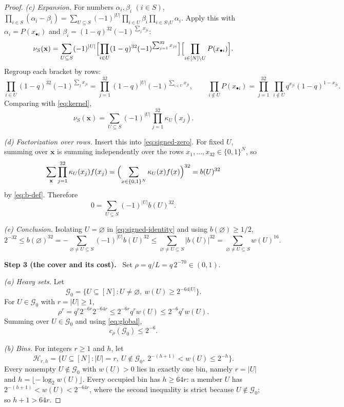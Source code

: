 \documentclass[11pt,letterpaper]{article}
\theoremstyle{definition}
\theoremstyle{remark}
\numberwithin{equation}{section}
\newcommand{\step}[1]{\medskip\noindent\textbf{#1.}\ }
\begin{document}
\begin{proof}
\emph{(c) Expansion.} For numbers $\alpha_i,\beta_i$ $(i\in S)$,
$\prod_{i\in S}(\alpha_i-\beta_i)
=\sum_{U\subseteq S}(-1)^{|U|}\prod_{i\in U}\beta_i
\prod_{i\in S\setminus U}\alpha_i$. Apply this with
$\alpha_i=P(x_{\bullet i})$ and
$\beta_i=(1-q)^{32}(-1)^{\sum_jx_{ji}}$:
\[
\nu_S(\mathbf x)=\sum_{U\subseteq S}(-1)^{|U|}
\Bigl[\prod_{i\in U}(1-q)^{32}(-1)^{\sum_{j=1}^{32}x_{ji}}\Bigr]
\Bigl[\prod_{i\in[N]\setminus U}P(x_{\bullet i})\Bigr].
\]
Regroup each bracket by rows:
\[
\prod_{i\in U}(1-q)^{32}(-1)^{\sum_{j}x_{ji}}
=\prod_{j=1}^{32}(1-q)^{|U|}(-1)^{\sum_{i\in U}x_{ji}},
\qquad
\prod_{i\notin U}P(x_{\bullet i})
=\prod_{j=1}^{32}\ \prod_{i\notin U}q^{x_{ji}}(1-q)^{1-x_{ji}}.
\]
Comparing with \eqref{eq:kernel},
\[
\nu_S(\mathbf x)=\sum_{U\subseteq S}(-1)^{|U|}\prod_{j=1}^{32}\kappa_U(x_j).
\]

\emph{(d) Factorization over rows.} Insert this into \eqref{eq:signed-zero}.
For fixed $U$, summing over $\mathbf x$ is summing independently over the rows
$x_1,\ldots,x_{32}\in\{0,1\}^N$, so
\[
\sum_{\mathbf x}\prod_{j=1}^{32}\kappa_U(x_j)f(x_j)
=\Bigl(\sum_{x\in\{0,1\}^N}\kappa_U(x)f(x)\Bigr)^{32}=b(U)^{32}
\]
by \eqref{eq:b-def}. Therefore
\begin{equation}\label{eq:signed-identity}
 0=\sum_{U\subseteq S}(-1)^{|U|}b(U)^{32}.
\end{equation}

\emph{(e) Conclusion.} Isolating $U=\varnothing$ in
\eqref{eq:signed-identity} and using $b(\varnothing)\ge1/2$,
\[
 2^{-32}\le b(\varnothing)^{32}
 =-\sum_{\varnothing\ne U\subseteq S}(-1)^{|U|}b(U)^{32}
 \le\sum_{\varnothing\ne U\subseteq S}|b(U)|^{32}
 =\sum_{\varnothing\ne U\subseteq S}w(U)^{16}.
\]

\step{Step 3 (the cover and its cost)}
Set $\rho=q/L=q\,2^{-70}\in(0,1)$.

\emph{(a) Heavy sets.} Let
\[
 \mathcal G_0=
 \{U\subseteq[N]:U\ne\varnothing,\ w(U)\ge2^{-64|U|}\}.
\]
For $U\in\mathcal G_0$ with $r=|U|\ge1$,
\[
 \rho^r=q^r2^{-6r}2^{-64r}
 \le2^{-6r}q^r w(U)
 \le2^{-6}q^r w(U).
\]
Summing over $U\in\mathcal G_0$ and using \eqref{eq:global},
\begin{equation}\label{eq:G0-cost}
 c_\rho(\mathcal G_0)\le2^{-6}.
\end{equation}

\emph{(b) Bins.} For integers $r\ge1$ and $h$, let
\[
 \mathcal H_{r,h}=
 \bigl\{U\subseteq[N]:|U|=r,\ U\notin\mathcal G_0,
 \ 2^{-(h+1)}<w(U)\le2^{-h}\bigr\}.
\]
Every nonempty $U\notin\mathcal G_0$ with $w(U)>0$ lies in exactly one bin,
namely $r=|U|$ and $h=\lfloor-\log_2w(U)\rfloor$. Every occupied bin has
$h\ge64r$: a member $U$ has $2^{-(h+1)}<w(U)<2^{-64r}$, where the second
inequality is strict because $U\notin\mathcal G_0$; so $h+1>64r$.


\end{proof}
\end{document}

